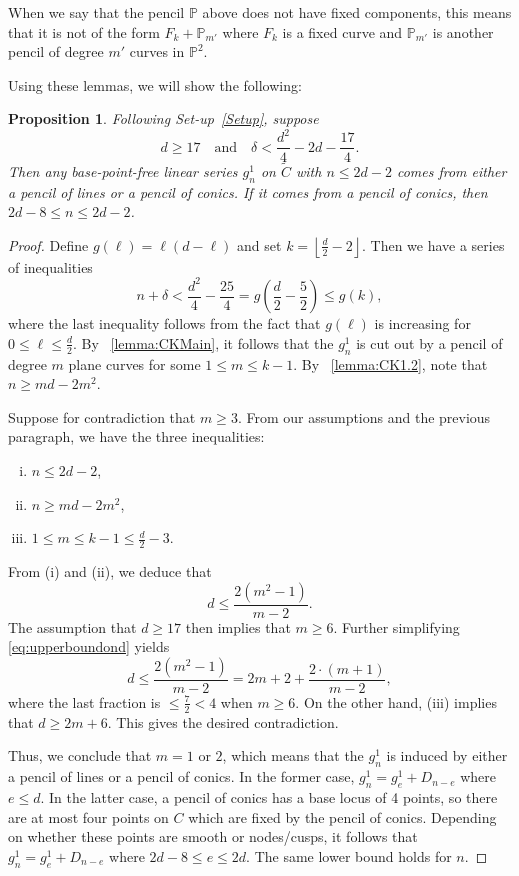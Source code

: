 \documentclass[fontsize=11pt,reqno]{amsart}
\newtheorem{proposition}[thm]{Proposition}
\theoremstyle{definition}
\theoremstyle{remark}
\newcommand{\tC}{\widetilde{C}}
\renewcommand{\P}{\mathbb{P}}
\begin{document}
\noindent When we say that the pencil $\P$ above does not have fixed components, this means that it is not of the form $F_{k} + \P_{m'}$ where $F_{k}$ is a fixed curve and $\P_{m'}$ is another pencil of degree $m'$ curves in $\P^{2}$.

Using these lemmas, we will show the following:

\begin{proposition}\label{prop:quadBoundConics}
    Following Set-up~\ref{Setup}, suppose
    \[ d \geq 17 \quad \text{and} \quad \delta < \frac{d^{2}}{4} - 2d - \frac{17}{4}. \]
    Then any base-point-free linear series $g^{1}_{n}$ on $\tC$ with $n \leq 2d-2$ comes from either a pencil of lines or a pencil of conics. If it comes from a pencil of conics, then $2d-8 \leq n \leq 2d-2$.
\end{proposition}

\begin{proof}
    Define $g(\ell) = \ell (d-\ell)$ and set $k = \left\lfloor \frac{d}{2} - 2 \right\rfloor$. Then we have a series of inequalities
    \[ n+\delta < \frac{d^{2}}{4} - \frac{25}{4} = g \left( \frac{d}{2}- \frac{5}{2} \right) \leq g(k), \]
    where the last inequality follows from the fact that $g(\ell)$ is increasing for $0 \leq \ell \leq \frac{d}{2}$. By ~\cref{lemma:CKMain}, it follows that the $g^{1}_{n}$ is cut out by a pencil of degree $m$ plane curves for some $1 \leq m \leq k-1$. By ~\cref{lemma:CK1.2}, note that $n \geq md - 2m^{2}$.

    Suppose for contradiction that $m \geq 3$. From our assumptions and the previous paragraph, we have the three inequalities:
    \begin{enumerate}[(i)]
        \item $n \leq 2d-2$,
        \item $n \geq md - 2m^{2}$,
        \item $1 \leq m \leq k-1 \leq \frac{d}{2} - 3$.
    \end{enumerate}
    From (i) and (ii), we deduce that
    \begin{equation}\label{eq:upperboundond}
    d \leq \frac{2(m^2-1)}{m-2}.
    \end{equation}
    The assumption that $d \geq 17$ then implies that $m \geq 6$. Further simplifying \eqref{eq:upperboundond} yields
    \[ d \leq \frac{2(m^2-1)}{m-2} = 2m + 2 + \frac{2 \cdot (m+1)}{m-2}, \]
    where the last fraction is $\leq \frac{7}{2} < 4$ when $m \geq 6$. On the other hand, (iii) implies that $d \geq 2m + 6$. This gives the desired contradiction.
    
    Thus, we conclude that $m = 1$ or $2$, which means that the $g^{1}_{n}$ is induced by either a pencil of lines or a pencil of conics. In the former case, $g^{1}_{n} = g^{1}_{e} + D_{n-e}$ where $e \leq d$. In the latter case, a pencil of conics has a base locus of 4 points, so there are at most four points on $C$ which are fixed by the pencil of conics. Depending on whether these points are smooth or nodes/cusps, it follows that $g^{1}_{n} = g^{1}_{e} + D_{n-e}$ where $2d-8 \leq e \leq 2d$. The same lower bound holds for $n$.
\end{proof}
\end{document}

